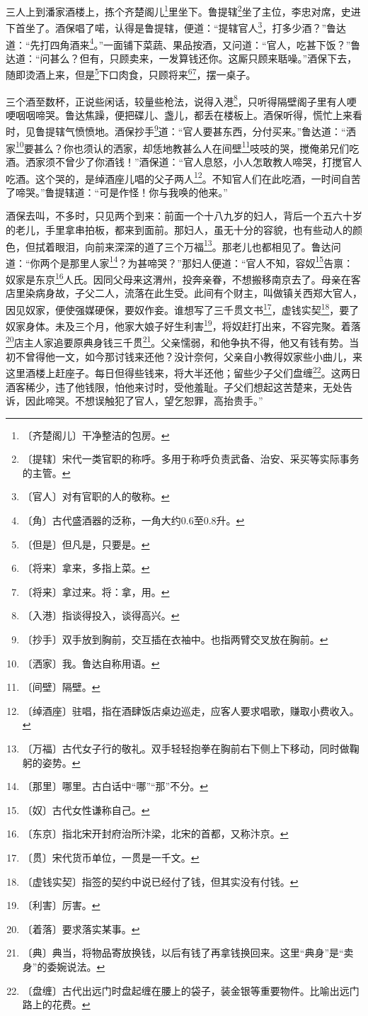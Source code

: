 \documentclass[12pt,UTF-8,openany]{ctexbook}
\begin{document}
\begin{normalsize}
    
    三人上到潘家酒楼上，拣个齐楚阁儿\footnote{〔齐楚阁儿〕干净整洁的包房。}里坐下。鲁提辖\footnote{〔提辖〕宋代一类官职的称呼。多用于称呼负责武备、治安、采买等实际事务的主管。}坐了主位，李忠对席，史进下首坐了。酒保唱了喏，认得是鲁提辖，便道：“提辖官人\footnote{〔官人〕对有官职的人的敬称。}，打多少酒？”鲁达道：“先打四角酒来\footnote{〔角〕古代盛酒器的泛称，一角大约0.6至0.8升。}。”一面铺下菜蔬、果品按酒，又问道：“官人，吃甚下饭？”鲁达道：“问甚么？但有，只顾卖来，一发算钱还你。这厮只顾来聒噪。”酒保下去，随即烫酒上来，但是\footnote{〔但是〕但凡是，只要是。}下口肉食，只顾将来\footnote{〔将来〕拿来，多指上菜。}\footnote{〔将来〕拿过来。将：拿，用。}，摆一桌子。
    
    三个酒至数杯，正说些闲话，较量些枪法，说得入港\footnote{〔入港〕指谈得投入，谈得高兴。}，只听得隔壁阁子里有人哽哽咽咽啼哭。鲁达焦躁，便把碟儿、盏儿，都丢在楼板上。酒保听得，慌忙上来看时，见鲁提辖气愤愤地。酒保抄手\footnote{〔抄手〕双手放到胸前，交互插在衣袖中。也指两臂交叉放在胸前。}道：“官人要甚东西，分付买来。”鲁达道：“洒家\footnote{〔洒家〕我。鲁达自称用语。}要甚么？你也须认的洒家，却恁地教甚么人在间壁\footnote{〔间壁〕隔壁。}吱吱的哭，搅俺弟兄们吃酒。洒家须不曾少了你酒钱！”酒保道：“官人息怒，小人怎敢教人啼哭，打搅官人吃酒。这个哭的，是绰酒座儿唱的父子两人\footnote{〔绰酒座〕驻唱，指在酒肆饭店桌边巡走，应客人要求唱歌，赚取小费收入。}。不知官人们在此吃酒，一时间自苦了啼哭。”鲁提辖道：“可是作怪！你与我唤的他来。”
    
    酒保去叫，不多时，只见两个到来：前面一个十八九岁的妇人，背后一个五六十岁的老儿，手里拿串拍板，都来到面前。那妇人，虽无十分的容貌，也有些动人的颜色，但拭着眼泪，向前来深深的道了三个万福\footnote{〔万福〕古代女子行的敬礼。双手轻轻抱拳在胸前右下侧上下移动，同时做鞠躬的姿势。}。那老儿也都相见了。鲁达问道：“你两个是那里人家\footnote{〔那里〕哪里。古白话中“哪”“那”不分。}？为甚啼哭？”那妇人便道：“官人不知，容奴\footnote{〔奴〕古代女性谦称自己。}告禀：奴家是东京\footnote{〔东京〕指北宋开封府治所汴梁，北宋的首都，又称汴京。}人氏。因同父母来这渭州，投奔亲眷，不想搬移南京去了。母亲在客店里染病身故，子父二人，流落在此生受。此间有个财主，叫做镇关西郑大官人，因见奴家，便使强媒硬保，要奴作妾。谁想写了三千贯文书\footnote{〔贯〕宋代货币单位，一贯是一千文。}，虚钱实契\footnote{〔虚钱实契〕指签的契约中说已经付了钱，但其实没有付钱。}，要了奴家身体。未及三个月，他家大娘子好生利害\footnote{〔利害〕厉害。}，将奴赶打出来，不容完聚。着落\footnote{〔着落〕要求落实某事。}店主人家追要原典身钱三千贯\footnote{〔典〕典当，将物品寄放换钱，以后有钱了再拿钱换回来。这里“典身”是“卖身”的委婉说法。}。父亲懦弱，和他争执不得，他又有钱有势。当初不曾得他一文，如今那讨钱来还他？没计奈何，父亲自小教得奴家些小曲儿，来这里酒楼上赶座子。每日但得些钱来，将大半还他；留些少子父们盘缠\footnote{〔盘缠〕古代出远门时盘起缠在腰上的袋子，装金银等重要物件。比喻出远门路上的花费。}。这两日酒客稀少，违了他钱限，怕他来讨时，受他羞耻。子父们想起这苦楚来，无处告诉，因此啼哭。不想误触犯了官人，望乞恕罪，高抬贵手。”
    

\end{normalsize}
\end{document}
